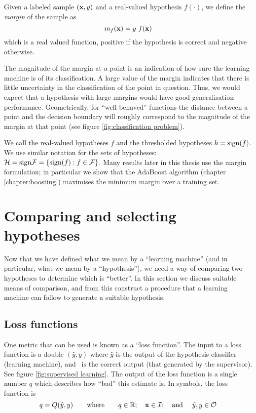 \begin{definition}
Given a labeled sample $(\mathbf{x}, y)$ and a real-valued hypothesis
$f(\cdot)$, we define the \emph{margin} of the sample as
%
\begin{equation}
m_{f}(\mathbf{x}) = y\ f(\mathbf{x})
\end{equation}
%
which is a real valued function, positive if the hypothesis is correct
and negative otherwise.
\end{definition}

The magnitude of the margin at a point is an indication of how sure the
learning machine is of its classification.  A large value of the
margin indicates that there is little uncertainty in the
classification of the point in question.  Thus, we would expect that a
hypothesis with large margins would have good generalisation
performance.  Geometrically, for ``well behaved'' functions the
distance between a point and the decision boundary will roughly
correspond to the magnitude of the margin at that point (see figure
\ref{fig:classification problem}).

We call the real-valued hypotheses $f$ and the thresholded
hypotheses $h = \mathrm{sign}(f)$.  We use similar notation for the sets of
hypotheses: $\mathcal{H} = \mathrm{sign} \mathcal{F} = \{ \mathrm{sign}(f) : f \in \mathcal{F} \}$.
Many results later in this thesis use the margin formulation; in
particular we show that the AdaBoost algorithm (chapter
\ref{chapter:boosting}) maximises the minimum margin over a training
set.


\section{Comparing and selecting hypotheses}
\label{sec:erm}

Now that we have defined what we mean by a ``learning machine'' (and
in particular, what we mean by a ``hypothesis''), we need a way of
comparing two hypotheses to determine which is ``better''.  In this
section we discuss suitable means of comparison, and from this
construct a procedure that a learning machine can follow to generate a
suitable hypothesis.


\subsection{Loss functions}
\label{sec:loss function}

One metric that can be used is known as a ``loss function''.  The
input to a loss function is a double $(\hat{y}, y)$ where $\hat{y}$ is
the output of the hypothesis classifier (learning 
machine), and \bfy\ is the correct output (that generated by the
supervisor).  See figure \ref{fig:supervised learning}.  The output of
the loss function is a single number $q$ which describes how ``bad''
this estimate is.  In symbols, the loss function is
%
\begin{equation}
q = Q(\hat{y}, y) \qquad \mbox{where} \qquad q \in \mathbb{R}; \quad
\mathbf{x} \in \mathcal{I}; \quad \mbox{and } \quad \hat{y}, y \in \mathcal{O}
\end{equation}

